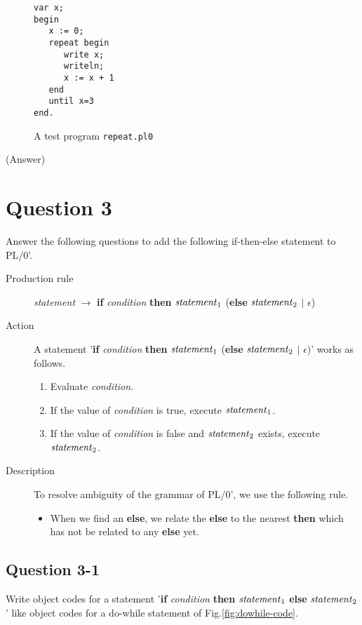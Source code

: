 \documentclass{article}
\begin{document}
\begin{figure}[h]
\begin{verbatim}
var x;
begin
   x := 0;
   repeat begin
      write x; 
      writeln;
      x := x + 1
   end
   until x=3
end.
\end{verbatim}
\caption{A test program {\tt repeat.pl0}}\label{fig:repeat-until}
\end{figure}


\ifreport
(Answer)\\
\fi




\newpage
\section*{Question 3}
Answer the following questions to add the following if-then-else statement to PL/0'.

\begin{description}
 \item[Production rule] {\it statement}  $\to$ {\bf if} {\it condition} {\bf then} 
       ${\it statement}_1$ ({\bf else} ${\it statement}_2$ $\vert$ {$\epsilon$})
 \item[Action] A statement '{\bf if} {\it condition} {\bf then} 
	    ${\it statement}_1$ ({\bf else} ${\it statement}_2$ $\vert$ {$\epsilon$})'
	    works as follows.
	    \begin{enumerate}
	     \item Evaluate {\it condition}.
	     \item If the value of {\it condition} is true, execute ${\it statement}_1$.
	     \item If the value of {\it condition} is false and ${\it statement}_2$ exists, 
		   execute ${\it statement}_2$.
	    \end{enumerate}
 \item[Description] To resolve ambiguity of the grammar of PL/0', 
	    we use the following rule.
	    \begin{itemize}
	     \item When we find an {\bf else}, we relate the {\bf else} to the nearest {\bf then}
		   which has not be related to any {\bf else} yet.
	    \end{itemize}
\end{description}


\subsection*{Question 3-1}
Write object codes for 
a statement '{\bf if} {\it condition} {\bf then}
${\it statement}_1$ {\bf else} ${\it statement}_2$'
like object codes for a do-while statement of Fig.\ref{fig:dowhile-code}.
\end{document}
